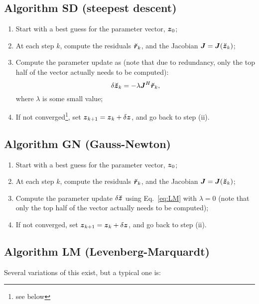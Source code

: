 \documentclass[useAMS,usenatbib]{mn2e}
\newcommand{\zz}{\bmath{z}}
\newcommand{\mat}[1]{{\bmath{#1}}}
\newcommand{\JJ}{\mat{J}} %
\newcommand{\AUG}[1]{\bmath{\breve{#1}}}
\newcommand{\Zz}{\AUG{z}}
\newcommand{\Rr}{\AUG{r}}
\begin{document}
\subsection{Algorithm SD (steepest descent)}

\begin{enumerate}
\item Start with a best guess for the parameter vector, $\bmath{z}_0$;
\item At each step $k$, compute the residuals $\Rr_k$, and the Jacobian
$\JJ=\JJ(\Zz_k)$;
\item Compute the parameter update as (note that due to redundancy, only the top half of the vector actually needs
to be computed):
\[
\delta\Zz_k = - \lambda \JJ^H \Rr_k,
\]
where $\lambda$ is some small value;
\item If not converged\footnote{see below}, set $\bmath{z}_{k+1}=\bmath{z}_k+\delta\zz$, and go back to step (ii).
\end{enumerate}

\subsection{Algorithm GN (Gauss-Newton)}

\begin{enumerate}
\item Start with a best guess for the parameter vector, $\bmath{z}_0$;
\item At each step $k$, compute the residuals $\Rr_k$, and the Jacobian
$\JJ=\JJ(\Zz_k)$;
\item Compute the parameter update $\delta\Zz$ using Eq.~\ref{eq:LM} with $\lambda=0$ (note that only the top half of the vector actually needs to be computed);
\item If not converged, set $\bmath{z}_{k+1}=\bmath{z}_k+\delta\zz$, and go back to step (ii).
\end{enumerate}

\subsection{Algorithm LM (Levenberg-Marquardt)}

Several variations of this exist, but a typical one is:
\end{document}

